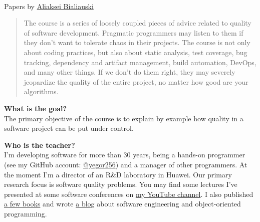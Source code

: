 \documentclass[nobrand,anonymous,nodate,nosecurity]{huawei}
\begin{document}
{\\
Papers by \href{h1alexbel.github.io/about-me.html}{Aliaksei Bialiauski}


\begin{abstract}
The course is a series of loosely coupled pieces of advice related to quality of software development.
Pragmatic programmers may listen to them if they don't want
to tolerate chaos in their projects. The course is not only about
coding practices, but also about static analysis, test coverage,
bug tracking, dependency and artifact management, build automation,
DevOps, and many other things. If we don't do them right, they may
severely jeopardize the quality of the entire project, no matter
how good are your algorithms.
\end{abstract}


\textbf{What is the goal?}\\
The primary objective of the course is to explain by example how
quality in a software project can be put under control.

\textbf{Who is the teacher?}\\
I'm developing software for more than 30 years, being a hands-on programmer
(see my GitHub account: \href{https://github.com/yegor256}{@yegor256})
and a manager of other programmers. At the moment I'm a director
of an R\&D laboratory in Huawei. Our primary research focus is
software quality problems. You may find some lectures I've presented
at some software conferences on
\href{https://www.youtube.com/channel/UCr9qCdqXLm2SU0BIs6d_68Q}{my YouTube channel}.
I also published \href{https://www.yegor256.com/books.html}{a few books}
and wrote \href{https://www.yegor256.com/contents.html}{a blog} about software engineering
and object-oriented programming.

}
\end{document}
